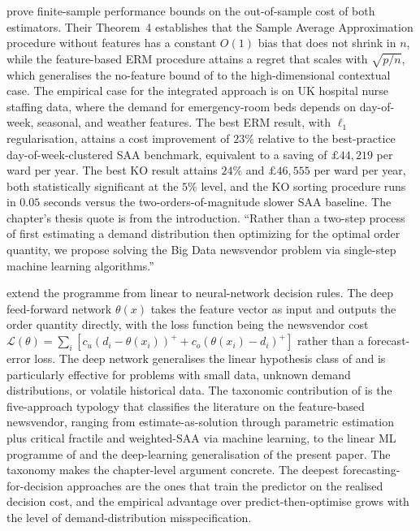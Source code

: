 \citet{BanRudin2019} prove finite-sample performance bounds on the
out-of-sample cost of both estimators. Their Theorem~4 establishes that the
Sample Average Approximation procedure without features has a constant
$O(1)$ bias that does not shrink in $n$, while the feature-based ERM
procedure attains a regret that scales with $\sqrt{p / n}$, which generalises
the no-feature bound of \citet{Levi2007} to the high-dimensional contextual
case. The empirical case for the integrated approach is on UK hospital nurse
staffing data, where the demand for emergency-room beds depends on
day-of-week, seasonal, and weather features. The best ERM result, with
$\ell_1$ regularisation, attains a cost improvement of $23\%$ relative to the
best-practice day-of-week-clustered SAA benchmark, equivalent to a saving of
$\pounds 44{,}219$ per ward per year. The best KO result attains $24\%$ and
$\pounds 46{,}555$ per ward per year, both statistically significant at the
$5\%$ level, and the KO sorting procedure runs in $0.05$ seconds versus the
two-orders-of-magnitude slower SAA baseline. The chapter's thesis quote is
from the introduction. ``Rather than a two-step process of first estimating
a demand distribution then optimizing for the optimal order quantity, we
propose solving the Big Data newsvendor problem via single-step machine
learning algorithms.''

\citet{Oroojlooyjadid2020} extend the \citet{BanRudin2019} programme from
linear to neural-network decision rules. The deep feed-forward network
$\theta(x)$ takes the feature vector as input and outputs the order quantity
directly, with the loss function being the newsvendor cost
$\mathcal L(\theta) = \sum_i [c_u (d_i - \theta(x_i))^+ + c_o
(\theta(x_i) - d_i)^+]$ rather than a forecast-error loss. The deep network
generalises the linear hypothesis class of \citet{BanRudin2019} and is
particularly effective for problems with small data, unknown demand
distributions, or volatile historical data. The taxonomic contribution of
\citet{Oroojlooyjadid2020} is the five-approach typology that classifies the
literature on the feature-based newsvendor, ranging from estimate-as-solution
through parametric estimation plus critical fractile and weighted-SAA via
machine learning, to the linear ML programme of \citet{BanRudin2019} and the
deep-learning generalisation of the present paper. The taxonomy makes the
chapter-level argument concrete. The deepest forecasting-for-decision
approaches are the ones that train the predictor on the realised decision
cost, and the empirical advantage over predict-then-optimise grows with the
level of demand-distribution misspecification.

